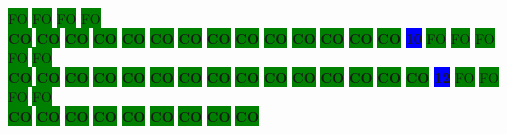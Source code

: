 \colorbox{green}{\color[gray]{0.75}FO}%
\colorbox{green}{\color[gray]{0.75}FO}%
\colorbox{green}{\color[gray]{0.75}FO}%
\colorbox{green}{\color[gray]{0.75}FO}%
\\
\colorbox{green}{\color[rgb]{0,0,0}\textbf{CO}}%
\colorbox{green}{\color[rgb]{0,0,0}\textbf{CO}}%
\colorbox{green}{\color[rgb]{0,0,0}\textbf{CO}}%
\colorbox{green}{\color[rgb]{0,0,0}\textbf{CO}}%
\colorbox{green}{\color[rgb]{0,0,0}\textbf{CO}}%
\colorbox{green}{\color[rgb]{0,0,0}\textbf{CO}}%
\colorbox{green}{\color[rgb]{0,0,0}\textbf{CO}}%
\colorbox{green}{\color[rgb]{0,0,0}\textbf{CO}}%
\colorbox{green}{\color[rgb]{0,0,0}\textbf{CO}}%
\colorbox{green}{\color[rgb]{0,0,0}\textbf{CO}}%
\colorbox{green}{\color[rgb]{0,0,0}\textbf{CO}}%
\colorbox{green}{\color[rgb]{0,0,0}\textbf{CO}}%
\colorbox{green}{\color[rgb]{0,0,0}\textbf{CO}}%
\colorbox{green}{\color[rgb]{0,0,0}\textbf{CO}}%
\colorbox{blue}{\color[rgb]{1,0,0}\textbf{10}}%
\colorbox{green}{\color[gray]{0.75}FO}%
\colorbox{green}{\color[gray]{0.75}FO}%
\colorbox{green}{\color[gray]{0.75}FO}%
\colorbox{green}{\color[gray]{0.75}FO}%
\colorbox{green}{\color[gray]{0.75}FO}%
\\
\colorbox{green}{\color[rgb]{0,0,0}\textbf{CO}}%
\colorbox{green}{\color[rgb]{0,0,0}\textbf{CO}}%
\colorbox{green}{\color[rgb]{0,0,0}\textbf{CO}}%
\colorbox{green}{\color[rgb]{0,0,0}\textbf{CO}}%
\colorbox{green}{\color[rgb]{0,0,0}\textbf{CO}}%
\colorbox{green}{\color[rgb]{0,0,0}\textbf{CO}}%
\colorbox{green}{\color[rgb]{0,0,0}\textbf{CO}}%
\colorbox{green}{\color[rgb]{0,0,0}\textbf{CO}}%
\colorbox{green}{\color[rgb]{0,0,0}\textbf{CO}}%
\colorbox{green}{\color[rgb]{0,0,0}\textbf{CO}}%
\colorbox{green}{\color[rgb]{0,0,0}\textbf{CO}}%
\colorbox{green}{\color[rgb]{0,0,0}\textbf{CO}}%
\colorbox{green}{\color[rgb]{0,0,0}\textbf{CO}}%
\colorbox{green}{\color[rgb]{0,0,0}\textbf{CO}}%
\colorbox{green}{\color[rgb]{0,0,0}\textbf{CO}}%
\colorbox{blue}{\color[rgb]{1,0,0}\textbf{12}}%
\colorbox{green}{\color[gray]{0.75}FO}%
\colorbox{green}{\color[gray]{0.75}FO}%
\colorbox{green}{\color[gray]{0.75}FO}%
\colorbox{green}{\color[gray]{0.75}FO}%
\\
\colorbox{green}{\color[rgb]{0,0,0}\textbf{CO}}%
\colorbox{green}{\color[rgb]{0,0,0}\textbf{CO}}%
\colorbox{green}{\color[rgb]{0,0,0}\textbf{CO}}%
\colorbox{green}{\color[rgb]{0,0,0}\textbf{CO}}%
\colorbox{green}{\color[rgb]{0,0,0}\textbf{CO}}%
\colorbox{green}{\color[rgb]{0,0,0}\textbf{CO}}%
\colorbox{green}{\color[rgb]{0,0,0}\textbf{CO}}%
\colorbox{green}{\color[rgb]{0,0,0}\textbf{CO}}%
\colorbox{green}{\color[rgb]{0,0,0}\textbf{CO}}%
